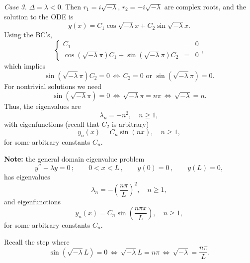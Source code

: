 \documentclass[11pt]{article}
\begin{document}
\begin{solution}
\par \textsl{Case 3.} $\Delta = \lambda <0 .$ Then $r_{1}=i\sqrt{-\lambda}$, $r_{2}=-i\sqrt{-\lambda}$ are complex roots, and the solution to the ODE is
\[y(x)=C_{1}\cos\sqrt{-\lambda}x+C_{2}\sin\sqrt{-\lambda}x.\]
Using the BC's,
\begin{equation*}
\left\{\begin{array}{rcl}
       C_{1}  & = & 0\\
       \cos(\sqrt{-\lambda}\pi)C_{1} + \sin(\sqrt{-\lambda}\pi)C_{2} & = & 0
      \end{array}\right. ,
\end{equation*}
which implies 
\[\sin(\sqrt{-\lambda}\pi)C_{2}=0 \,\Leftrightarrow\, C_{2} = 0 \text{ or } \sin(\sqrt{-\lambda}\pi)=0.\]
For nontrivial solutions we need 
\[\sin(\sqrt{-\lambda}\pi)=0 \,\Leftrightarrow \, \sqrt{-\lambda}\pi=n\pi\,\Leftrightarrow \, \sqrt{-\lambda}=n.\] 
Thus, the eigenvalues are
\[\boxed{\lambda_{n}=-n^{2}}, \quad n\geq 1,\]
with eigenfunctions (recall that $C_{2}$ is arbitrary)
\[\boxed{y_{n}(x)=C_{n}\sin(nx)}, \quad n\geq 1,\]
for some arbitrary constants $C_{n}$.

\textbf{Note:} the general domain eigenvalue problem
\begin{equation*}
y^{\prime \prime} - \lambda y =0\,; \qquad  0<x<L \,, \qquad y(0)=0  \,,\qquad y(L) =0,
\end{equation*}
has eigenvalues
\[\boxed{\lambda_{n}=-\left( \frac{n\pi}{L}\right)^{2}}, \quad n\geq 1,\]
and eigenfunctions
\[\boxed{y_{n}(x)=C_{n}\sin\left( \frac{n\pi x}{L} \right)}, \quad n\geq 1,\]
for some arbitrary constants $C_{n}$.

Recall the step where
\[\sin(\sqrt{-\lambda}L)=0 \,\Leftrightarrow \, \sqrt{-\lambda}L=n\pi\,\Leftrightarrow \, \sqrt{-\lambda}=\frac{n\pi}{L}.\] 
\end{solution}
\end{document}
